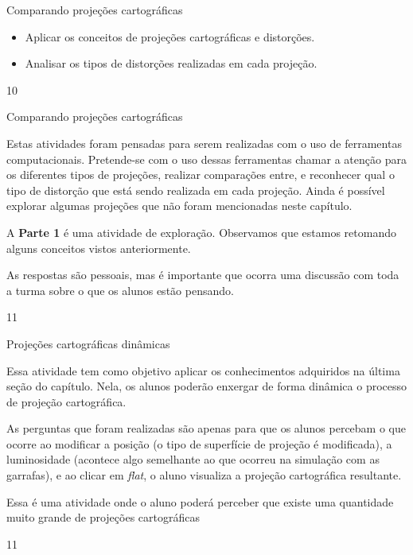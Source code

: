 \begin{objectives}{Comparando projeções cartográficas}
{
  \begin{itemize}
  \item Aplicar os conceitos de projeções cartográficas e distorções.
  \item Analisar os tipos de distorções realizadas em cada projeção.
  \end{itemize}
}{1}{0}
\end{objectives}
\clearmargin
\begin{sugestions}{Comparando projeções cartográficas}
{
  Estas atividades foram pensadas para serem realizadas com o uso de ferramentas computacionais. Pretende-se com o uso dessas ferramentas chamar a atenção para os diferentes tipos de projeções, realizar comparações entre, e reconhecer qual o tipo de distorção que está sendo realizada em cada projeção. Ainda é possível explorar algumas projeções que não foram mencionadas neste capítulo.

  A \textbf{Parte 1} é uma atividade de exploração. Observamos que estamos retomando alguns conceitos vistos anteriormente.

  As respostas são pessoais, mas é importante que ocorra uma discussão com toda a turma sobre o que os alunos estão pensando.
}{1}{1}
\end{sugestions}
\begin{objectives}{Projeções cartográficas dinâmicas}
{
  Essa atividade tem como objetivo aplicar os conhecimentos adquiridos na última seção do capítulo.  Nela, os alunos poderão enxergar de forma dinâmica o processo de projeção cartográfica.

  As perguntas que foram realizadas são apenas para que os alunos percebam o que ocorre ao modificar a posição (o tipo de superfície de projeção é modificada), a luminosidade (acontece algo semelhante ao que ocorreu na simulação com as garrafas), e ao clicar em \textit{flat}, o aluno visualiza a projeção cartográfica resultante.

  Essa é uma atividade onde o aluno poderá perceber que existe uma quantidade muito grande de projeções cartográficas
}{1}{1}
\end{objectives}

